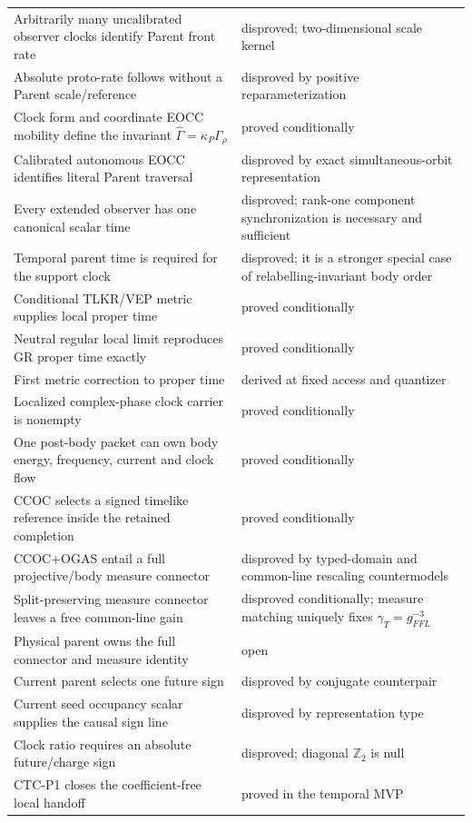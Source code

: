 \documentclass[11pt]{article}
\begin{document}
\begin{longtable}{L{.44\linewidth}L{.42\linewidth}}
Arbitrarily many uncalibrated observer clocks identify Parent front rate & disproved; two-dimensional scale kernel\\
Absolute proto-rate follows without a Parent scale/reference & disproved by positive reparameterization\\
Clock form and coordinate EOCC mobility define the invariant
\(\widehat\Gamma=\kappa_P\Gamma_\rho\) & proved conditionally\\
Calibrated autonomous EOCC identifies literal Parent traversal & disproved by
exact simultaneous-orbit representation\\
Every extended observer has one canonical scalar time & disproved; rank-one
component synchronization is necessary and sufficient\\
Temporal parent time is required for the support clock & disproved; it is a
stronger special case of relabelling-invariant body order\\
Conditional TLKR/VEP metric supplies local proper time & proved conditionally\\
Neutral regular local limit reproduces GR proper time exactly & proved conditionally\\
First metric correction to proper time & derived at fixed access and quantizer\\
Localized complex-phase clock carrier is nonempty & proved conditionally\\
One post-body packet can own body energy, frequency, current and clock flow & proved conditionally\\
CCOC selects a signed timelike reference inside the retained completion & proved conditionally\\
CCOC+OGAS entail a full projective/body measure connector & disproved by typed-domain and common-line rescaling countermodels\\
Split-preserving measure connector leaves a free common-line gain & disproved conditionally; measure matching uniquely fixes $\gamma_T=g_{FFL}^{-3}$\\
Physical parent owns the full connector and measure identity & open\\
Current parent selects one future sign & disproved by conjugate counterpair\\
Current seed occupancy scalar supplies the causal sign line & disproved by representation type\\
Clock ratio requires an absolute future/charge sign & disproved; diagonal $\mathbb Z_2$ is null\\
CTC-P1 closes the coefficient-free local handoff & proved in the temporal MVP\\

\end{longtable}
\end{document}
